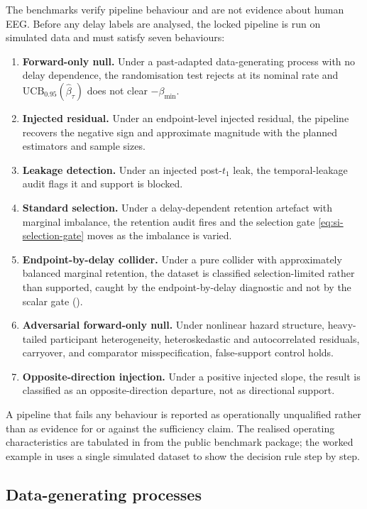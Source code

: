 \documentclass[11pt,a4paper]{article}
\theoremstyle{definition}
\newcommand{\UCB}{\mathrm{UCB}_{0.95}}
\begin{document}
The benchmarks verify pipeline behaviour and are not evidence about human EEG.
Before any delay labels are analysed, the locked pipeline is run on simulated data
and must satisfy seven behaviours:
\begin{enumerate}[leftmargin=2.0em,itemsep=2pt]
\item \textbf{Forward-only null.} Under a past-adapted data-generating process
with no delay dependence, the randomisation test rejects at its nominal rate and
\(\UCB(\widehat{\beta}_\tau)\) does not clear \(-\beta_{\min}\).
\item \textbf{Injected residual.} Under an endpoint-level injected residual, the
pipeline recovers the negative sign and approximate magnitude with the planned
estimators and sample sizes.
\item \textbf{Leakage detection.} Under an injected post-\(t_1\) leak, the
temporal-leakage audit flags it and support is blocked.
\item \textbf{Standard selection.} Under a delay-dependent retention artefact with
marginal imbalance, the retention audit fires and the selection gate
\eqref{eq:si-selection-gate} moves as the imbalance is varied.
\item \textbf{Endpoint-by-delay collider.} Under a pure collider with approximately
balanced marginal retention, the dataset is classified selection-limited rather
than supported, caught by the endpoint-by-delay diagnostic and not by the scalar
gate ().
\item \textbf{Adversarial forward-only null.} Under nonlinear hazard structure,
heavy-tailed participant heterogeneity, heteroskedastic and autocorrelated
residuals, carryover, and comparator misspecification, false-support control holds.
\item \textbf{Opposite-direction injection.} Under a positive injected slope, the
result is classified as an opposite-direction departure, not as directional
support.
\end{enumerate}
A pipeline that fails any behaviour is reported as operationally unqualified
rather than as evidence for or against the sufficiency claim. The realised
operating characteristics are tabulated in  from the public
benchmark package; the worked example in  uses a single
simulated dataset to show the decision rule step by step.

\subsection{Data-generating processes}
\label{sec:si-dgp}
\end{document}
